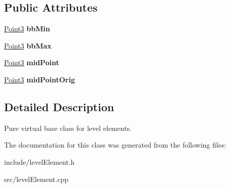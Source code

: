 \subsection*{\-Public \-Attributes}
\begin{DoxyCompactItemize}
\item 
\hypertarget{classLevelElement_a98ecc4b84e9ce0cd2ebe5c4d7b395c4a}{
\hyperlink{classPoint3}{\-Point3} {\bfseries bb\-Min}}
\label{d3/d59/classLevelElement_a98ecc4b84e9ce0cd2ebe5c4d7b395c4a}

\item 
\hypertarget{classLevelElement_aaa442a037cedd5029548ae0eb38fef70}{
\hyperlink{classPoint3}{\-Point3} {\bfseries bb\-Max}}
\label{d3/d59/classLevelElement_aaa442a037cedd5029548ae0eb38fef70}

\item 
\hypertarget{classLevelElement_a03a57272c298c19dbc8283bca6341613}{
\hyperlink{classPoint3}{\-Point3} {\bfseries mid\-Point}}
\label{d3/d59/classLevelElement_a03a57272c298c19dbc8283bca6341613}

\item 
\hypertarget{classLevelElement_a59cb8af82056df7eceed2cb51d090481}{
\hyperlink{classPoint3}{\-Point3} {\bfseries mid\-Point\-Orig}}
\label{d3/d59/classLevelElement_a59cb8af82056df7eceed2cb51d090481}

\end{DoxyCompactItemize}


\subsection{\-Detailed \-Description}
\-Pure virtual base class for level elements. 

\-The documentation for this class was generated from the following files\-:\begin{DoxyCompactItemize}
\item 
include/level\-Element.\-h\item 
src/level\-Element.\-cpp\end{DoxyCompactItemize}
